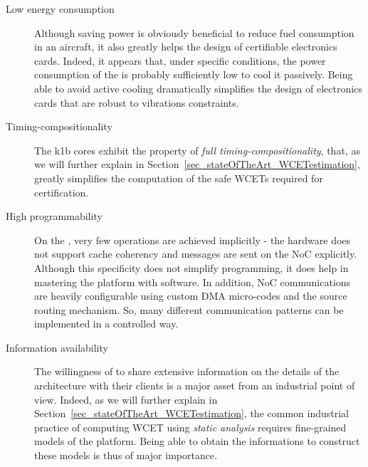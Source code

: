\documentclass[main.tex]{subfiles}
\begin{document}
\begin{description}
    \item[Low energy consumption]
    Although saving power is obviously beneficial to reduce fuel consumption in an aircraft, it also greatly helps the design of certifiable electronics cards. Indeed, it appears that, under specific conditions, the power consumption of the \mppalong is probably sufficiently low to cool it passively. Being able to avoid active cooling dramatically simplifies the design of electronics cards that are robust to vibrations constraints.

    \item[Timing-compositionality]
    The k1b cores exhibit the property of \emph{full timing-compositionality}, that, as we will further explain in Section~\ref{sec_stateOfTheArt_WCETestimation}, greatly simplifies the computation of the safe WCETs required for certification.

    \item[High programmability]
    On the \mppalong, very few operations are achieved implicitly - the hardware does not support cache coherency and messages are sent on the NoC explicitly. Although this specificity does not simplify programming, it does help in mastering the platform with software. In addition, NoC communications are heavily configurable using custom DMA micro-codes and the source routing mechanism. So, many different communication patterns can be implemented in a controlled way.

    \item[Information availability]
    The willingness of \kalray to share extensive information on the details of the architecture with their clients is a major asset from an industrial point of view. Indeed, as we will further explain in Section~\ref{sec_stateOfTheArt_WCETestimation}, the common industrial practice of computing WCET using \emph{static analysis} requires fine-grained models of the platform. Being able to obtain the informations to construct these models is thus of major importance.
\end{description}
\end{document}
